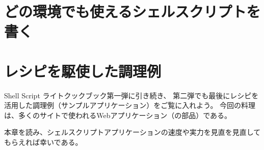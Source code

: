\documentclass[b5paper,9pt,fleqn,tombow,openany]{jsbook}
\begin{document}


\chapter{どの環境でも使えるシェルスクリプトを書く}



\chapter{レシピを駆使した調理例}

Shell Script ライトクックブック第一弾に引き続き、
第二弾でも最後にレシピを活用した調理例（サンプルアプリケーション）をご覧に入れよう。
今回の料理は、多くのサイトで使われるWebアプリケーション（の部品）である。

本章を読み、シェルスクリプトアプリケーションの速度や実力を見直を見直してもらえれば幸いである。





\backmatter


\end{document}
